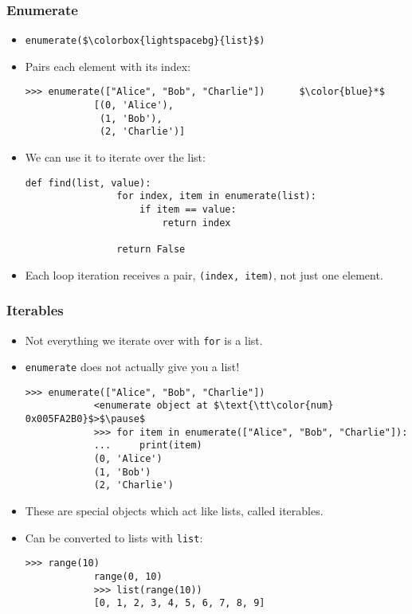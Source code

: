 \documentclass[notes]{beamer}
\begin{document}
	\begin{frame}[fragile]
		\frametitle{Enumerate}
		
		\begin{itemize}
			\item \lstinline|enumerate($\colorbox{lightspacebg}{list}$)|
			
			\item Pairs each element with its index:
			\begin{lstlisting}[xleftmargin=\dimexpr-\leftmargini]
			>>> enumerate(["Alice", "Bob", "Charlie"])      $\color{blue}*$
			[(0, 'Alice'),
			 (1, 'Bob'),
			 (2, 'Charlie')]
			\end{lstlisting}
			
			\item We can use it to iterate over the list: 
			\begin{lstlisting}[xleftmargin=\dimexpr-\leftmargini]
			def find(list, value):
			    for index, item in enumerate(list):
			        if item == value:
			            return index
			
			    return False
			\end{lstlisting}
			
			\item Each loop iteration receives a pair, \lstinline|(index, item)|, not just one element.
		\end{itemize}
		
	\end{frame}
	
	\begin{frame}[fragile]
		\frametitle{Iterables}
		
		\begin{itemize}
			\item Not everything we iterate over with \lstinline|for| is a list.
			
			\pause
			
			\item \lstinline|enumerate| does not actually give you a list!
			\begin{lstlisting}[xleftmargin=\dimexpr-\leftmargini, basicstyle=\scriptsize\tt]
			>>> enumerate(["Alice", "Bob", "Charlie"])
			<enumerate object at $\text{\tt\color{num} 0x005FA2B0}$>$\pause$
			>>> for item in enumerate(["Alice", "Bob", "Charlie"]):
			...     print(item)
			(0, 'Alice')
			(1, 'Bob')
			(2, 'Charlie')
			\end{lstlisting}
			
			\pause
			
			\item These are special objects which act like lists, called \colorbox{jargonbg}{iterables}.
			
			\item Can be converted to lists with \lstinline|list|:
			\begin{lstlisting}[xleftmargin=\dimexpr-\leftmargini]
			>>> range(10)
			range(0, 10)
			>>> list(range(10))
			[0, 1, 2, 3, 4, 5, 6, 7, 8, 9]
			\end{lstlisting}
			
		\end{itemize}
	\end{frame}
	
\end{document}
